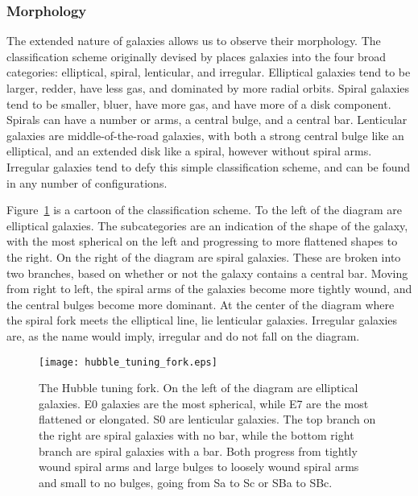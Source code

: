 \subsubsection{Morphology}

The extended nature of galaxies allows us to observe their morphology.  The classification scheme originally devised by \citet{hubble_1926} places galaxies into the four broad categories:  elliptical, spiral, lenticular, and irregular.  Elliptical galaxies tend to be larger, redder, have less gas, and dominated by more radial orbits.  Spiral galaxies tend to be smaller, bluer, have more gas, and have more of a disk component.  Spirals can have a number or arms, a central bulge, and a central bar.  Lenticular galaxies are middle-of-the-road galaxies, with both a strong central bulge like an elliptical, and an extended disk like a spiral, however without spiral arms.  Irregular galaxies tend to defy this simple classification scheme, and can be found in any number of configurations.

Figure~\ref{fig:tuning_fork} is a cartoon of the classification scheme.  To the left of the diagram are elliptical galaxies.  The subcategories are an indication of the shape of the galaxy, with the most spherical on the left and progressing to more flattened shapes to the right.  On the right of the diagram are spiral galaxies.  These are broken into two branches, based on whether or not the galaxy contains a central bar.  Moving from right to left, the spiral arms of the galaxies become more tightly wound, and the central bulges become more dominant.  At the center of the diagram where the spiral fork meets the elliptical line, lie lenticular galaxies.  Irregular galaxies are, as the name would imply, irregular and do not fall on the diagram.

\begin{figure}[H]
\centering
\texttt{[image: hubble\_tuning\_fork.eps]}
\caption[The Hubble tuning fork]{\footnotesize The Hubble tuning fork.  On the left of the diagram are elliptical galaxies.  E0 galaxies are the most spherical, while E7 are the most flattened or elongated.  S0 are lenticular galaxies.  The top branch on the right are spiral galaxies with no bar, while the bottom right branch are spiral galaxies with a bar.  Both progress from tightly wound spiral arms and large bulges to loosely wound spiral arms and small to no bulges, going from Sa to Sc or SBa to SBc.}
\label{fig:tuning_fork}
\end{figure}


